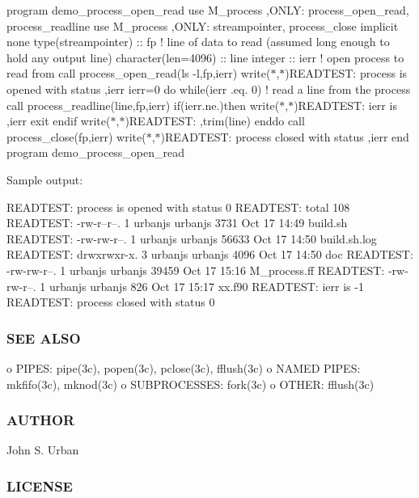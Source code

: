 program demo\+\_\+process\+\_\+open\+\_\+read use M\+\_\+process ,O\+N\+LY\+: process\+\_\+open\+\_\+read, process\+\_\+readline use M\+\_\+process ,O\+N\+LY\+: streampointer, process\+\_\+close implicit none type(streampointer) \+:\+: fp ! line of data to read (assumed long enough to hold any output line) character(len=4096) \+:\+: line integer \+:\+: ierr ! open process to read from call process\+\_\+open\+\_\+read(\textquotesingle{}ls -\/l\textquotesingle{},fp,ierr) write($\ast$,$\ast$)\textquotesingle{}R\+E\+A\+D\+T\+E\+ST\+: process is opened with status \textquotesingle{},ierr ierr=0 do while(ierr .eq. 0) ! read a line from the process call process\+\_\+readline(line,fp,ierr) if(ierr.\+ne.)then write($\ast$,$\ast$)\textquotesingle{}R\+E\+A\+D\+T\+E\+ST\+: ierr is \textquotesingle{},ierr exit endif write($\ast$,$\ast$)\textquotesingle{}R\+E\+A\+D\+T\+E\+ST\+: \textquotesingle{},trim(line) enddo call process\+\_\+close(fp,ierr) write($\ast$,$\ast$)\textquotesingle{}R\+E\+A\+D\+T\+E\+ST\+: process closed with status \textquotesingle{},ierr end program demo\+\_\+process\+\_\+open\+\_\+read

Sample output\+:

R\+E\+A\+D\+T\+E\+ST\+: process is opened with status 0 R\+E\+A\+D\+T\+E\+ST\+: total 108 R\+E\+A\+D\+T\+E\+ST\+: -\/rw-\/r--r--. 1 urbanjs urbanjs 3731 Oct 17 14\+:49 build.\+sh R\+E\+A\+D\+T\+E\+ST\+: -\/rw-\/rw-\/r--. 1 urbanjs urbanjs 56633 Oct 17 14\+:50 build.\+sh.\+log R\+E\+A\+D\+T\+E\+ST\+: drwxrwxr-\/x. 3 urbanjs urbanjs 4096 Oct 17 14\+:50 doc R\+E\+A\+D\+T\+E\+ST\+: -\/rw-\/rw-\/r--. 1 urbanjs urbanjs 39459 Oct 17 15\+:16 M\+\_\+process.\+ff R\+E\+A\+D\+T\+E\+ST\+: -\/rw-\/rw-\/r--. 1 urbanjs urbanjs 826 Oct 17 15\+:17 xx.\+f90 R\+E\+A\+D\+T\+E\+ST\+: ierr is -\/1 R\+E\+A\+D\+T\+E\+ST\+: process closed with status 0

\subsubsection*{S\+EE A\+L\+SO}

o P\+I\+P\+ES\+: pipe(3c), popen(3c), pclose(3c), fflush(3c) o N\+A\+M\+ED P\+I\+P\+ES\+: mkfifo(3c), mknod(3c) o S\+U\+B\+P\+R\+O\+C\+E\+S\+S\+ES\+: fork(3c) o O\+T\+H\+ER\+: fflush(3c) \subsubsection*{A\+U\+T\+H\+OR}

John S. Urban \subsubsection*{L\+I\+C\+E\+N\+SE}

